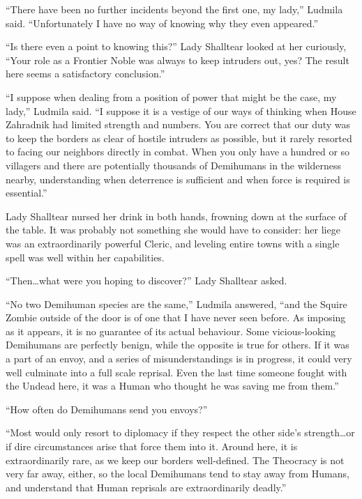 

“There have been no further incidents beyond the first one, my lady,” Ludmila said. “Unfortunately I have no way of knowing why they even appeared.”

 

“Is there even a point to knowing this?” Lady Shalltear looked at her curiously, “Your role as a Frontier Noble was always to keep intruders out, yes? The result here seems a satisfactory conclusion.”

 

“I suppose when dealing from a position of power that might be the case, my lady,” Ludmila said. “I suppose it is a vestige of our ways of thinking when House Zahradnik had limited strength and numbers. You are correct that our duty was to keep the borders as clear of hostile intruders as possible, but it rarely resorted to facing our neighbors directly in combat. When you only have a hundred or so villagers and there are potentially thousands of Demihumans in the wilderness nearby, understanding when deterrence is sufficient and when force is required is essential.”

 

Lady Shalltear nursed her drink in both hands, frowning down at the surface of the table. It was probably not something she would have to consider: her liege was an extraordinarily powerful Cleric, and leveling entire towns with a single spell was well within her capabilities.

 

“Then…what were you hoping to discover?” Lady Shalltear asked.

 

“No two Demihuman species are the same,” Ludmila answered, “and the Squire Zombie outside of the door is of one that I have never seen before. As imposing as it appears, it is no guarantee of its actual behaviour. Some vicious-looking Demihumans are perfectly benign, while the opposite is true for others. If it was a part of an envoy, and a series of misunderstandings is in progress, it could very well culminate into a full scale reprisal. Even the last time someone fought with the Undead here, it was a Human who thought he was saving me from them.”

 

“How often do Demihumans send you envoys?”

 

“Most would only resort to diplomacy if they respect the other side’s strength…or if dire circumstances arise that force them into it. Around here, it is extraordinarily rare, as we keep our borders well-defined. The Theocracy is not very far away, either, so the local Demihumans tend to stay away from Humans, and understand that Human reprisals are extraordinarily deadly.”

